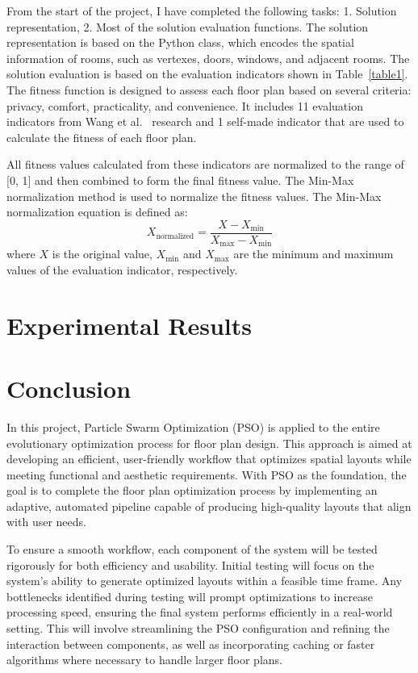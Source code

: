 \documentclass[]{article}
\begin{document}
From the start of the project, I have completed the following tasks: 1. Solution representation, 2. Most of the solution evaluation functions. The solution representation is based on the Python class, which encodes the spatial information of rooms, such as vertexes, doors, windows, and adjacent rooms.
The solution evaluation is based on the evaluation indicators shown in Table~\ref{table1}. The fitness function is designed to assess each floor plan based on several criteria: privacy, comfort, practicality, and convenience. It includes 11 evaluation indicators from Wang et al.~\cite{WANG2023100238} research and 1 self-made indicator that are used to calculate the fitness of each floor plan.

All fitness values calculated from these indicators are normalized to the range of [0, 1] and then combined to form the final fitness value. The Min-Max normalization method is used to normalize the fitness values. The Min-Max normalization equation is defined as:
\begin{equation*}
    X_{\text{normalized}} = \frac{X - X_{\text{min}}}{X_{\text{max}} - X_{\text{min}}}
\end{equation*}
where $X$ is the original value, $X_{\text{min}}$ and $X_{\text{max}}$ are the minimum and maximum values of the evaluation indicator, respectively.

\section{Experimental Results}


\section{Conclusion}
In this project, Particle Swarm Optimization (PSO) is applied to the entire evolutionary optimization process for floor plan design. This approach is aimed at developing an efficient, user-friendly workflow that optimizes spatial layouts while meeting functional and aesthetic requirements. With PSO as the foundation, the goal is to complete the floor plan optimization process by implementing an adaptive, automated pipeline capable of producing high-quality layouts that align with user needs.

To ensure a smooth workflow, each component of the system will be tested rigorously for both efficiency and usability. Initial testing will focus on the system’s ability to generate optimized layouts within a feasible time frame. Any bottlenecks identified during testing will prompt optimizations to increase processing speed, ensuring the final system performs efficiently in a real-world setting. This will involve streamlining the PSO configuration and refining the interaction between components, as well as incorporating caching or faster algorithms where necessary to handle larger floor plans.
\end{document}

